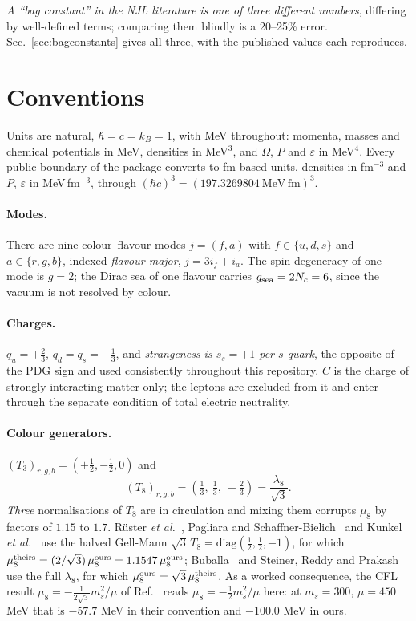 \documentclass[aps,prc,onecolumn,superscriptaddress,nofootinbib,10pt]{revtex4-2}
\begin{document}
\emph{A ``bag constant'' in the NJL literature is one of three different
numbers}, differing by well-defined terms; comparing them blindly is a
20--25\% error. Sec.~\ref{sec:bagconstants} gives all three, with the published
values each reproduces.

\section{Conventions}
\label{sec:conventions}

Units are natural, $\hbar = c = k_B = 1$, with MeV throughout: momenta, masses
and chemical potentials in MeV, densities in MeV$^3$, and $\Omega$, $P$ and
$\varepsilon$ in MeV$^4$. Every public boundary of the package converts to
fm-based units, densities in fm$^{-3}$ and $P$, $\varepsilon$ in MeV\,fm$^{-3}$,
through $(\hbar c)^3 = (197.3269804\ \mathrm{MeV\,fm})^3$.

\paragraph{Modes.} There are nine colour--flavour modes $j = (f,a)$ with
$f \in \{u,d,s\}$ and $a \in \{r,g,b\}$, indexed \emph{flavour-major},
$j = 3 i_f + i_a$. The spin degeneracy of one mode is $g = 2$; the Dirac sea of
one flavour carries $g_{\rm sea} = 2N_c = 6$, since the vacuum is not resolved
by colour.

\paragraph{Charges.} $q_u = +\tfrac23$, $q_d = q_s = -\tfrac13$, and
\emph{strangeness is $s_s = +1$ per $s$ quark}, the opposite of the PDG sign
and used consistently throughout this repository. $C$ is the charge of
strongly-interacting matter only; the leptons are excluded from it and enter
through the separate condition of total electric neutrality.

\paragraph{Colour generators.} $(T_3)_{r,g,b} = (+\tfrac12,-\tfrac12,0)$ and
\begin{equation}
  (T_8)_{r,g,b} = \left(\tfrac13,\ \tfrac13,\ -\tfrac23\right)
  = \frac{\lambda_8}{\sqrt3} .
\end{equation}
\emph{Three} normalisations of $T_8$ are in circulation and mixing them
corrupts $\mu_8$ by factors of $1.15$ to $1.7$. R\"uster \textit{et
al.}~\cite{Ruester2005}, Pagliara and Schaffner-Bielich~\cite{Pagliara2008} and
Kunkel \textit{et al.}~\cite{Kunkel2026} use the halved Gell-Mann
$\sqrt3\,T_8 = \mathrm{diag}(\tfrac12,\tfrac12,-1)$, for which
$\mu_8^{\rm theirs} = (2/\sqrt3)\,\mu_8^{\rm ours} = 1.1547\,\mu_8^{\rm ours}$;
Buballa~\cite{Buballa2005} and Steiner, Reddy and Prakash~\cite{Steiner2002}
use the full $\lambda_8$, for which $\mu_8^{\rm ours} =
\sqrt3\,\mu_8^{\rm theirs}$. As a worked consequence, the CFL result
$\mu_8 = -\tfrac1{2\sqrt3} m_s^2/\mu$ of Ref.~\cite{Steiner2002} reads
$\mu_8 = -\tfrac12 m_s^2/\mu$ here: at $m_s = 300$, $\mu = 450$ MeV that is
$-57.7$ MeV in their convention and $-100.0$ MeV in ours.
\end{document}
